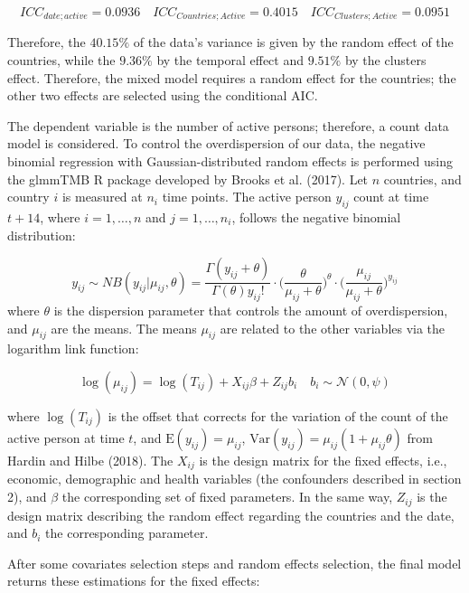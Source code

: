 \documentclass[
  6pt,
]{article}
\begin{document}
\[
ICC_{date; active} = 0.0936 \quad ICC_{Countries; Active} = 0.4015 \quad ICC_{Clusters; Active} = 0.0951 
\]

Therefore, the \(40.15\%\) of the data's variance is given by the random
effect of the countries, while the \(9.36\%\) by the temporal effect and
\(9.51\%\) by the clusters effect. Therefore, the mixed model requires a
random effect for the countries; the other two effects are selected
using the conditional AIC.

The dependent variable is the number of active persons; therefore, a
count data model is considered. To control the overdispersion of our
data, the negative binomial regression with Gaussian-distributed random
effects is performed using the glmmTMB R package developed by Brooks et
al. (2017). Let \(n\) countries, and country \(i\) is measured at
\(n_i\) time points. The active person \(y_{ij}\) count at time
\(t+14\), where \(i=1,\dots, n\) and \(j = 1, \dots,n_i\), follows the
negative binomial distribution:

\[y_{ij} \sim NB(y_{ij}|\mu_{ij}, \theta) = \dfrac{\Gamma(y_{ij}+ \theta)}{\Gamma(\theta) y_{ij}!} \cdot \Big(\dfrac{\theta}{\mu_{ij} + \theta}\Big)^{\theta}\cdot \Big(\dfrac{\mu_{ij}}{\mu_{ij} + \theta}\Big)^{y_{ij}}\]
where \(\theta\) is the dispersion parameter that controls the amount of
overdispersion, and \(\mu_{ij}\) are the means. The means \(\mu_{ij}\)
are related to the other variables via the logarithm link function:

\[\log(\mu_{ij}) = \log(T_{ij}) + X_{ij} \beta + Z_{ij} b_i \quad b_i \sim \mathcal{N}(0,\psi)\]

where \(\log(T_{ij})\) is the offset that corrects for the variation of
the count of the active person at time \(t\), and
\(\text{E}(y_{ij}) = \mu_{ij}\),
\(\text{Var}(y_{ij}) = \mu_{ij} (1 + \mu_{ij}\theta)\) from Hardin and
Hilbe (2018). The \(X_{ij}\) is the design matrix for the fixed effects,
i.e., economic, demographic and health variables (the confounders
described in section 2), and \(\beta\) the corresponding set of fixed
parameters. In the same way, \(Z_{ij}\) is the design matrix describing
the random effect regarding the countries and the date, and \(b_i\) the
corresponding parameter.

After some covariates selection steps and random effects selection, the
final model returns these estimations for the fixed effects:
\end{document}
